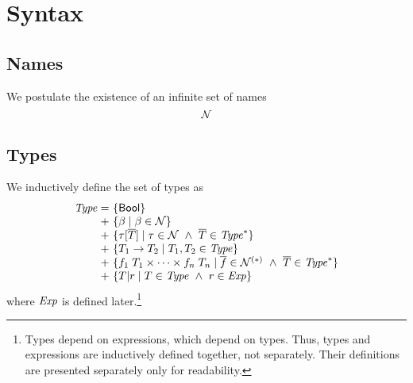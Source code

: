 \section{Syntax}
\label{syntax}

\subsection{Names}

We postulate the existence of an infinite set of names
\[
\mathcal{N}
\]


\subsection{Types}

We inductively define the set of types as
\[
\setdefVI
 {\Typ}
 {+}
 {\setI{\bool}}
 {\setST{\tvar}{\tvar\in\Nam}}
 {\setST{\tinstO}{\tnam\in\Nam\AND\typS\in\Seq{\Typ}}}
 {\setST{\tarr{\typ_1}{\typ_2}}{\typ_1,\typ_2\in\Typ}}
 {\setST{\trecFTO}{\fnamS\in\SeqNR{\Nam}\AND\typS\in\Seq{\Typ}}}
 {\setST{\tsubO}{\typ\in\Typ\AND\tspred\in\Expr}}
\]
where $\mathit{Exp}$ is defined later.\footnote{Types depend on expressions, which
depend on types. Thus, types and expressions are inductively defined together,
not separately. Their definitions are presented separately only for
readability.}

